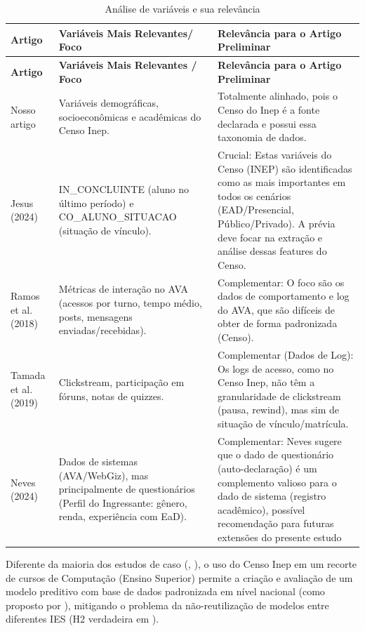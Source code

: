 \documentclass[english, spanish, brazilian]{RBIEarticle} %
\begin{document}
\begin{longtable}{|p{3cm}|p{5.5cm}|p{7cm}|}
    \caption{Análise de variáveis e sua relevância}\\
    \toprule
    \textbf{Artigo} & \textbf{Variáveis Mais Relevantes/ Foco} & \textbf{Relevância para o Artigo Preliminar} \\
    \midrule
    \endfirsthead
    \toprule
    \textbf{Artigo} & \textbf{Variáveis Mais Relevantes / Foco} & \textbf{Relevância para o Artigo Preliminar} \\
    \midrule
    \endhead
    Nosso artigo & Variáveis demográficas, socioeconômicas e acadêmicas do Censo Inep. & Totalmente alinhado, pois o Censo do Inep é a fonte declarada e possui essa taxonomia de dados. \\ \hline
    
    Jesus (2024) & IN\_CONCLUINTE (aluno no último período) e CO\_ALUNO\_SITUACAO (situação de vínculo). & Crucial: Estas variáveis do Censo (INEP) são identificadas como as mais importantes em todos os cenários (EAD/Presencial, Público/Privado). A prévia deve focar na extração e análise dessas features do Censo. \\ \hline
    
    Ramos et al. (2018) & Métricas de interação no AVA (acessos por turno, tempo médio, posts, mensagens enviadas/recebidas). & Complementar: O foco são os dados de comportamento e log do AVA, que são difíceis de obter de forma padronizada (Censo). \\ \hline
    
    Tamada et al. (2019) & Clickstream, participação em fóruns, notas de quizzes. & Complementar (Dados de Log): Os logs de acesso, como no Censo Inep, não têm a granularidade de clickstream (pausa, rewind), mas sim de situação de vínculo/matrícula. \\ \hline
    
    Neves (2024) & Dados de sistemas (AVA/WebGiz), mas principalmente de questionários (Perfil do Ingressante: gênero, renda, experiência com EaD). & Complementar: Neves sugere que o dado de questionário (auto-declaração) é um complemento valioso para o dado de sistema (registro acadêmico), possível recomendação para futuras extensões do presente estudo \\ 
    \bottomrule
\end{longtable}

Diferente da maioria dos estudos de caso (\cite{ramos2018comparativo}, \cite{neves2024ficare}), o uso do Censo Inep em um recorte de cursos de Computação (Ensino Superior) permite a criação e avaliação de um modelo preditivo com base de dados padronizada em nível nacional (como proposto por \cite{jesus2024mapeamento}), mitigando o problema da não-reutilização de modelos entre diferentes IES (H2 verdadeira em \cite{jesus2024mapeamento}).
\end{document}

